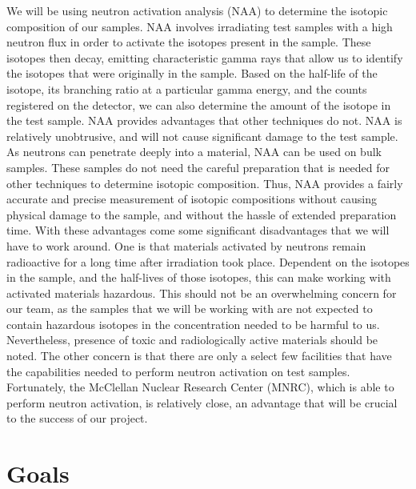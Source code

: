 \documentclass[]{article}
\begin{document}
We will be using neutron activation analysis (NAA) to determine the isotopic composition of our samples. NAA involves irradiating test samples with a high neutron flux in order to activate the isotopes present in the sample. These isotopes then decay, emitting characteristic gamma rays that allow us to identify the isotopes that were originally in the sample. Based on the half-life of the isotope, its branching ratio at a particular gamma energy, and the counts registered on the detector, we can also determine the amount of the isotope in the test sample. NAA provides advantages that other techniques do not. NAA is relatively unobtrusive, and will not cause significant damage to the test sample. As neutrons can penetrate deeply into a material, NAA can be used on bulk samples. These samples do not need the careful preparation that is needed for other techniques to determine isotopic composition. Thus, NAA provides a fairly accurate and precise measurement of isotopic compositions without causing physical damage to the sample, and without the hassle of extended preparation time. With these advantages come some significant disadvantages that we will have to work around. One is that materials activated by neutrons remain radioactive for a long time after irradiation took place. Dependent on the isotopes in the sample, and the half-lives of those isotopes, this can make working with activated materials hazardous. This should not be an overwhelming concern for our team, as the samples that we will be working with are not expected to contain hazardous isotopes in the concentration needed to be harmful to us. Nevertheless, presence of toxic and radiologically active materials should be noted. The other concern is that there are only a select few facilities that have the capabilities needed to perform neutron activation on test samples. Fortunately, the McClellan Nuclear Research Center (MNRC), which is able to perform neutron activation, is relatively close, an advantage that will be crucial to the success of our project.

            



\section{Goals}
\end{document}
